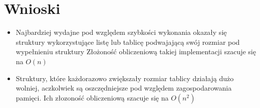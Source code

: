 \documentclass[a4paper,11pt]{article}
\begin{document}
\section{Wnioski}

\begin{itemize}
\item Najbardziej wydajne pod względem szybkości wykonania okazały się struktury wykorzystujące listę lub tablicę podwajającą swój rozmiar pod wypełnieniu struktury
Złożoność obliczeniową takiej implementacji szacuje się na $ O(n) $
\item Struktury, które każdorazowo zwiększały rozmiar tablicy działają dużo wolniej, aczkolwiek są oszczędniejsze pod względem zagospodarowania pamięci.
Ich złozoność obliczeniową szacuje się na $ O(n^{2}) $
\end{itemize}
\end{document}

